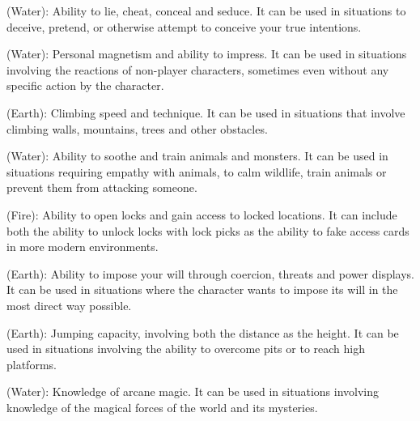 \begin{multicols}{2}
\begin{ffcolpage}
 (Water): Ability to lie, cheat, conceal and seduce. It can be used in situations to deceive, pretend, or otherwise attempt to conceive your true intentions.
\end{ffcolpage} \pw

\begin{ffcolpage}
 (Water): Personal magnetism and ability to impress. It can be used in situations involving the reactions of non-player characters, sometimes even without any specific action by the character.
\end{ffcolpage} \pw

\begin{ffcolpage}
 (Earth): Climbing speed and technique. It can be used in situations that involve climbing walls, mountains, trees and other obstacles.
\end{ffcolpage} \pw

\begin{ffcolpage}
 (Water): Ability to soothe and train animals and monsters. It can be used in situations requiring empathy with animals, to calm wildlife, train animals or prevent them from attacking someone.
\end{ffcolpage} \pw

\begin{ffcolpage}
 (Fire): Ability to open locks and gain access to locked locations. It can include both the ability to unlock locks with lock picks as the ability to fake access cards in more modern environments.
\end{ffcolpage} \pw

\begin{ffcolpage}
 (Earth): Ability to impose your will through coercion, threats and power displays. It can be used in situations where the character wants to impose its will in the most direct way possible.
\end{ffcolpage} \pw

\begin{ffcolpage}
 (Earth): Jumping capacity, involving both the distance as the height. It can be used in situations involving the ability to overcome pits or to reach high platforms.
\end{ffcolpage} \pw

\begin{ffcolpage}
 (Water): Knowledge of arcane magic. It can be used in situations involving knowledge of the magical forces of the world and its mysteries.
\end{ffcolpage} \pw


\end{multicols}
